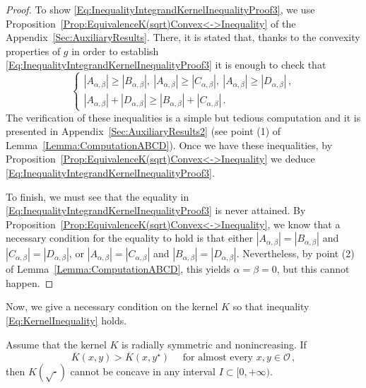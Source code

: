 \begin{proof}
To show \eqref{Eq:InequalityIntegrandKernelInequalityProof3}, we use Proposition~\ref{Prop:EquivalenceK(sqrt)Convex<->Inequality} of the Appendix~\ref{Sec:AuxiliaryResults}. There, it is stated that, thanks to the convexity properties of $g$ in order to establish \eqref{Eq:InequalityIntegrandKernelInequalityProof3} it is enough to check that
$$
\begin{cases}
|A_{\alpha,\beta}| \geq |B_{\alpha,\beta}|,\ |A_{\alpha,\beta}| \geq |C_{\alpha,\beta}|, \ |A_{\alpha,\beta}| \geq |D_{\alpha,\beta}|\,, \\
|A_{\alpha,\beta}| + |D_{\alpha,\beta}| \geq |B_{\alpha,\beta}| + |C_{\alpha,\beta}|\,.
\end{cases}
$$
The verification of these inequalities is a simple but tedious computation and it is presented in Appendix~\ref{Sec:AuxiliaryResults2} (see point (1) of Lemma~\ref{Lemma:ComputationABCD}). Once we have these inequalities, by Proposition~\ref{Prop:EquivalenceK(sqrt)Convex<->Inequality} we deduce \eqref{Eq:InequalityIntegrandKernelInequalityProof3}.

To finish, we must see that the equality in \eqref{Eq:InequalityIntegrandKernelInequalityProof3} is never attained. By Proposition~\ref{Prop:EquivalenceK(sqrt)Convex<->Inequality}, we know that a necessary condition for the equality to hold is that either $|A_{\alpha,\beta}| = |B_{\alpha,\beta}|$ and $|C_{\alpha,\beta}| = |D_{\alpha,\beta}|$, or $|A_{\alpha,\beta}| = |C_{\alpha,\beta}|$ and $|B_{\alpha,\beta}| = |D_{\alpha,\beta}|$. Nevertheless, by point (2) of Lemma~\eqref{Lemma:ComputationABCD}, this yields $\alpha = \beta = 0$, but this cannot happen.
\end{proof}


Now, we give a necessary condition on the kernel $K$ so that inequality \eqref{Eq:KernelInequality} holds.

\begin{proposition}
\label{Prop:KernelInequalityNecessaryCondition} Assume that the kernel $K$ is radially symmetric and
nonincreasing. If
\begin{equation}
\label{Eq:KernelInequalityAE}
\overline{K}(x,y) > \overline{K}(x, y^\star) \quad \text{ for almost every }x,y \in \mathcal{O}\,,
\end{equation}
then $K(\sqrt{\cdot})$ cannot be concave in any interval $I\subset [0,+\infty)$.
\end{proposition}

